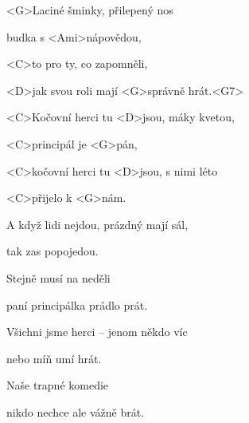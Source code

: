 
\zs
<G>Laciné šminky, přilepený nos

budka s <Ami>nápovědou,

<C>to pro ty, co zapomněli,

<D>jak svou roli mají <G>správně hrát.<G7> 
\ks
\zr

<C>Kočovní herci tu <D>jsou, máky kvetou,

<C>principál je <G>pán,

<C>kočovní herci tu <D>jsou, s nimi léto

<C>přijelo k <G>nám.
\kr
\zs

A když lidi nejdou, prázdný mají sál,

tak zas popojedou.

Stejně musí na neděli

paní principálka prádlo prát.

\ks
\zr \kr
\zs


Všichni jsme herci -- jenom někdo víc

nebo míň umí hrát.

Naše trapné komedie

nikdo nechce ale vážně brát.
\ks

\zr
\kr

\kp
